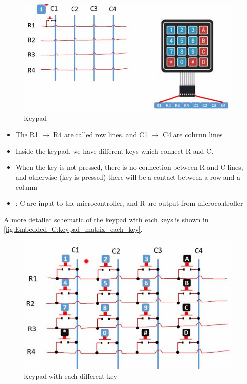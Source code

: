 \begin{figure}[h]
\centering
\includegraphics[scale=0.55]{Figures/Embedded_C/keypad_matrix}
\caption{Keypad}
\label{fig:Embedded_C:keypad_matrix}
\end{figure}


\begin{itemize}
    \item The R1 $\rightarrow$ R4 are called row lines, and C1 $\rightarrow$ C4 are column lines

    \item Inside the keypad, we have different keys which connect R and C.

    \item When the key is not pressed, there is no connection between R and C lines, and otherwise (key is pressed) there will be a contact between a row and a column

    \item : C are input to the microcontroller, and R are output from microcontroller

\end{itemize}

A more detailed schematic of the keypad with each keys is shown in \autoref{fig:Embedded_C:keypad_matrix_each_key}.

\begin{figure}[h]
\centering
\includegraphics[scale=0.55]{Figures/Embedded_C/keypad_matrix_each_key}
\caption{Keypad with each different key}
\label{fig:Embedded_C:keypad_matrix_each_key}
\end{figure}


